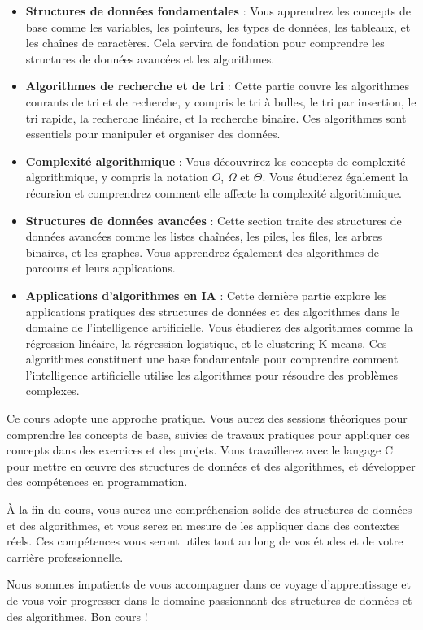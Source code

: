 \begin{itemize}
	\item \textbf{Structures de données fondamentales} : Vous apprendrez les concepts de base comme les variables, les pointeurs, les types de données, les tableaux, et les chaînes de caractères. Cela servira de fondation pour comprendre les structures de données avancées et les algorithmes.
	
	\item \textbf{Algorithmes de recherche et de tri} : Cette partie couvre les algorithmes courants de tri et de recherche, y compris le tri à bulles, le tri par insertion, le tri rapide, la recherche linéaire, et la recherche binaire. Ces algorithmes sont essentiels pour manipuler et organiser des données.
	
	\item \textbf{Complexité algorithmique} : Vous découvrirez les concepts de complexité algorithmique, y compris la notation $O$, $\Omega$ et $\Theta$. Vous étudierez également la récursion et comprendrez comment elle affecte la complexité algorithmique.
	
	\item \textbf{Structures de données avancées} : Cette section traite des structures de données avancées comme les listes chaînées, les piles, les files, les arbres binaires, et les graphes. Vous apprendrez également des algorithmes de parcours et leurs applications.
	
	\item \textbf{Applications d'algorithmes en IA} : Cette dernière partie explore les applications pratiques des structures de données et des algorithmes dans le domaine de l'intelligence artificielle. Vous étudierez des algorithmes comme la régression linéaire, la régression logistique, et le clustering K-means. Ces algorithmes constituent une base fondamentale pour comprendre comment l'intelligence artificielle utilise les algorithmes pour résoudre des problèmes complexes.
\end{itemize}

Ce cours adopte une approche pratique. Vous aurez des sessions théoriques pour comprendre les concepts de base, suivies de travaux pratiques pour appliquer ces concepts dans des exercices et des projets. Vous travaillerez avec le langage C pour mettre en œuvre des structures de données et des algorithmes, et développer des compétences en programmation.

À la fin du cours, vous aurez une compréhension solide des structures de données et des algorithmes, et vous serez en mesure de les appliquer dans des contextes réels. Ces compétences vous seront utiles tout au long de vos études et de votre carrière professionnelle.

Nous sommes impatients de vous accompagner dans ce voyage d'apprentissage et de vous voir progresser dans le domaine passionnant des structures de données et des algorithmes. Bon cours !
